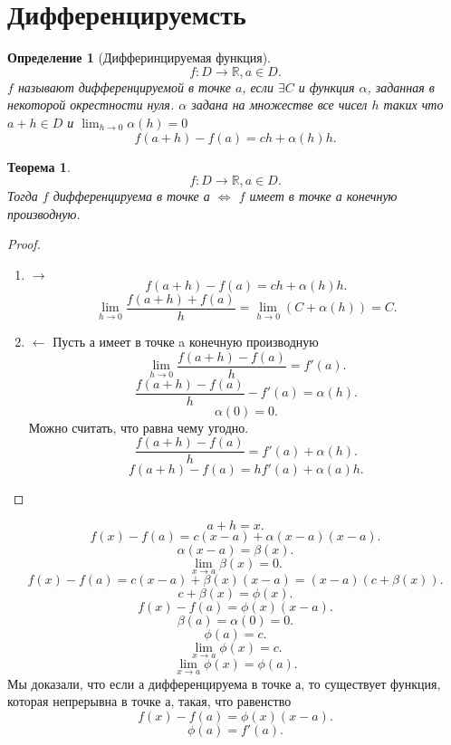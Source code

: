 \documentclass[a4paper]{article}
\newtheorem{theorem}{Теорема}
\newtheorem{definition}{Определение}
\begin{document}
\section{Дифференцируемсть}
\begin{definition}[Дифферинцируемая функция]
    \[
    f : D \to \mathbb{R},  a \in D
    .\] 
    $f$ называют дифференцируемой в точке  $a$, если  $\exists  C$ и функция $\alpha$, заданная в некоторой окрестности нуля. $\alpha$ задана на множестве все чисел  $h$ таких что  $a + h \in D$ и $\lim_{h \to 0} \alpha(h) = 0$ 
    \[
    f(a + h ) - f(a) = ch + \alpha(h)h
    .\] 
\end{definition}
\begin{theorem}
    \[
    f : D \to \mathbb{R}, a\in D
    .\] 
    Тогда $f$ дифференцируема в точке а  $\iff$  $f$ имеет в точке а конечную производную.
\end{theorem}
\begin{proof}
    \begin{enumerate}
        \item $\rightarrow$
            \[
            f(a + h) - f(a) = ch + \alpha(h)h
            .\] 
            \[
            \lim_{h \to 0} \frac{f(a + h) + f(a)}{h} = \lim_{h \to 0} (C + \alpha(h)) =  C
            .\] 
        \item $\leftarrow$
            Пусть $а$ имеет в точке a конечную производную
             \[
                 \lim_{h \to 0} \frac{f(a + h) - f(a)}{h} =  f'(a)
            .\] 
            \[
            \frac{f(a + h) - f(a)}{h} - f'(a) = \alpha(h)
            .\] 
            \[
                \alpha(0) = 0
            .\] 
            Можно считать, что равна чему угодно.
            \[
            \frac{f(a + h) - f(a)}{h} = f'(a) + \alpha(h)
            .\] 
            \[
            f(a + h) - f(a) = hf'(a) + \alpha(a)h
            .\] 
    \end{enumerate}
\end{proof}
\[
a + h = x
.\] 
\[
f(x) - f(a) = c(x - a) + \alpha(x - a)(x  - a)
.\] 
\[
\alpha(x - a) =  \beta(x)
.\] 
\[
\lim_{x \to a} \beta(x) = 0
.\] 
\[
f(x) - f(a) = c(x - a) + \beta(x)(x  - a)= (x - a)(c + \beta(x))
.\] 
\[
c + \beta(x) = \phi(x)
.\] 
\[
    f(x) - f(a) = \phi{(x)}(x-a)
.\] 
\[
    \beta(a) = \alpha(0) = 0
.\] 
\[
\phi(a) =  c
.\] 
\[
\lim_{x \to a} \phi(x) = c
.\] 
\[
    \lim_{x \to a} \phi(x) = \phi(a)
.\] 
Мы доказали, что если а дифференцируема в точке а, то существует функция, которая непрерывна в точке а, такая, что равенство
\[
f(x) - f(a) = \phi(x)(x - a)
.\] 
\[
\phi(a) = f'(a)
.\] 
\end{document}
